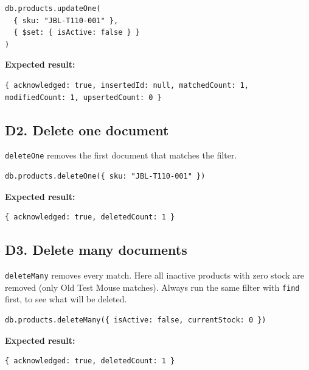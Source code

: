 \documentclass[11pt,a4paper]{article}
\newcommand{\code}[1]{\texttt{#1}}
\begin{document}
\begin{minipage}{\linewidth}
\begin{lstlisting}[style=query]
db.products.updateOne(
  { sku: "JBL-T110-001" },
  { $set: { isActive: false } }
)
\end{lstlisting}
\end{minipage}

\noindent\textbf{Expected result:}
\begin{lstlisting}[style=result]
{ acknowledged: true, insertedId: null, matchedCount: 1, modifiedCount: 1, upsertedCount: 0 }
\end{lstlisting}

\subsection*{D2. Delete one document}
\code{deleteOne} removes the first document that matches the filter.

\begin{minipage}{\linewidth}
\begin{lstlisting}[style=query]
db.products.deleteOne({ sku: "JBL-T110-001" })
\end{lstlisting}
\end{minipage}

\noindent\textbf{Expected result:}
\begin{lstlisting}[style=result]
{ acknowledged: true, deletedCount: 1 }
\end{lstlisting}

\subsection*{D3. Delete many documents}
\code{deleteMany} removes every match. Here all inactive products with zero stock are removed (only Old Test Mouse matches). Always run the same filter with \code{find} first, to see what will be deleted.

\begin{minipage}{\linewidth}
\begin{lstlisting}[style=query]
db.products.deleteMany({ isActive: false, currentStock: 0 })
\end{lstlisting}
\end{minipage}

\noindent\textbf{Expected result:}
\begin{lstlisting}[style=result]
{ acknowledged: true, deletedCount: 1 }
\end{lstlisting}
\end{document}
